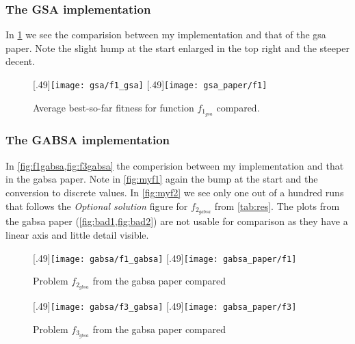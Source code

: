 
 
%
\subsubsection*{The GSA implementation}
In \cref{fig:f1} we see the comparision between my implementation and that of the \ac{gsa} paper. Note the slight hump at the start enlarged in the top right and the steeper decent.
%
\begin{figure}
	\centering
		[.49\linewidth]{\texttt{[image: gsa/f1\_gsa]}}
		[.49\linewidth]{\texttt{[image: gsa\_paper/f1]}}
	\caption{Average best-so-far fitness for function $f_{1_{gsa}}$ compared.}
    \label{fig:f1}
\end{figure}
%
\subsubsection*{The GABSA implementation}
In \cref{fig:f1gabsa,fig:f3gabsa} the comperision between my implementation and that in the \ac{gabsa} paper. Note in \cref{fig:myf1} again the bump at the start and the conversion to discrete values. In \cref{fig:myf2} we see only one out of a hundred runs that follows the \textit{Optional solution} figure for $f_{2_{gabsa}}$ from \cref{tab:res}. The plots from the \ac{gabsa} paper (\cref{fig:bad1,fig:bad2}) are not usable for comparison as they have a linear axis and little detail visible.
%
\begin{figure}
	\centering
		[.49\linewidth]{\texttt{[image: gabsa/f1\_gabsa]}}
		[.49\linewidth]{\texttt{[image: gabsa\_paper/f1]}}
	\caption{Problem $f_{2_{gbsa}}$ from the \ac{gabsa} paper\cite{GABSA} compared}
    \label{fig:f1gabsa}
\end{figure}
%
\begin{figure}
	\centering
		[.49\linewidth]{\texttt{[image: gabsa/f3\_gabsa]}}
		[.49\linewidth]{\texttt{[image: gabsa\_paper/f3]}}
	\caption{Problem $f_{3_{gbsa}}$ from the \ac{gabsa} paper\cite{GABSA} compared}
    \label{fig:f3gabsa}
\end{figure}
%

